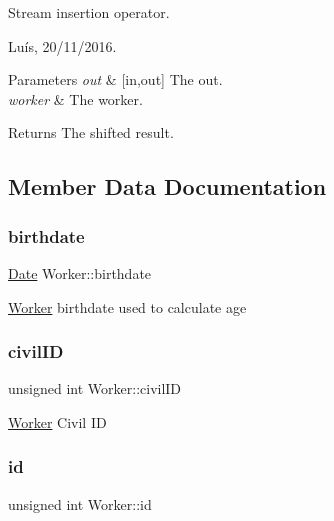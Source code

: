 Stream insertion operator. 

Luís, 20/11/2016. 


\begin{DoxyParams}{Parameters}
{\em out} & \mbox{[}in,out\mbox{]} The out. \\
\hline
{\em worker} & The worker. \\
\hline
\end{DoxyParams}


\begin{DoxyReturn}{Returns}
The shifted result. 
\end{DoxyReturn}


\subsection{Member Data Documentation}
\hypertarget{class_worker_a3c1845f40a084b471750a787a87614dd}{}\label{class_worker_a3c1845f40a084b471750a787a87614dd} 
\subsubsection{\texorpdfstring{birthdate}{birthdate}}
{\footnotesize\ttfamily \hyperlink{class_date}{Date} Worker\+::birthdate\hspace{0.3cm}{\ttfamily [protected]}}

\hyperlink{class_worker}{Worker} birthdate used to calculate age \hypertarget{class_worker_adfafba55f967994f4595bd914bbba127}{}\label{class_worker_adfafba55f967994f4595bd914bbba127} 
\subsubsection{\texorpdfstring{civil\+ID}{civilID}}
{\footnotesize\ttfamily unsigned int Worker\+::civil\+ID\hspace{0.3cm}{\ttfamily [protected]}}

\hyperlink{class_worker}{Worker} Civil ID \hypertarget{class_worker_afc39287cd510977cfe7697ed2c86b2ca}{}\label{class_worker_afc39287cd510977cfe7697ed2c86b2ca} 
\subsubsection{\texorpdfstring{id}{id}}
{\footnotesize\ttfamily unsigned int Worker\+::id\hspace{0.3cm}{\ttfamily [protected]}}

